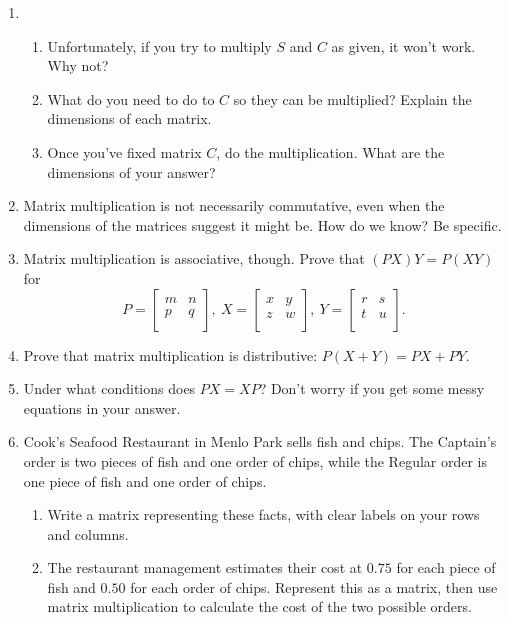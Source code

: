 \documentclass[../textbook.tex]{subfiles}
\begin{document}
\begin{enumerate}
\setcounter{enumi}{\value{problem_i}}
\item \begin{enumerate}
\item Unfortunately, if you try to multiply $S$ and $C$ as given, it won't work. Why not?
\item What do you need to do to $C$ so they can be multiplied? Explain the dimensions of each matrix.
\item Once you've fixed matrix $C$, do the multiplication. What are the dimensions of your answer?
\end{enumerate}
\item Matrix multiplication is not necessarily commutative, even when the dimensions of the matrices suggest it might be. How do we know? Be specific.
\item Matrix multiplication is associative, though. Prove that $(PX)Y=P(XY)$ for $$P=\left[\begin{array}{cc} m & n \\ p & q \\ \end{array}\right],\: X=\left[\begin{array}{cc} x & y \\ z & w \\ \end{array}\right],\: Y=\left[\begin{array}{cc} r & s \\ t & u \\ \end{array}\right].$$
\item Prove that matrix multiplication is distributive: $P(X+Y)=PX+PY$.
\item Under what conditions does $PX=XP$? Don't worry if you get some messy equations in your answer.
\item Cook's Seafood Restaurant in Menlo Park sells fish and chips. The Captain's order is two pieces of fish and one order of chips, while the Regular order is one piece of fish and one order of chips.
\begin{enumerate}
\item Write a matrix representing these facts, with clear labels on your rows and columns.
\item The restaurant management estimates their cost at $0.75$ for each piece of fish and $0.50$ for each order of chips. Represent this as a matrix, then use matrix multiplication to calculate the cost of the two possible orders.

\end{enumerate}
\end{enumerate}
\end{document}
